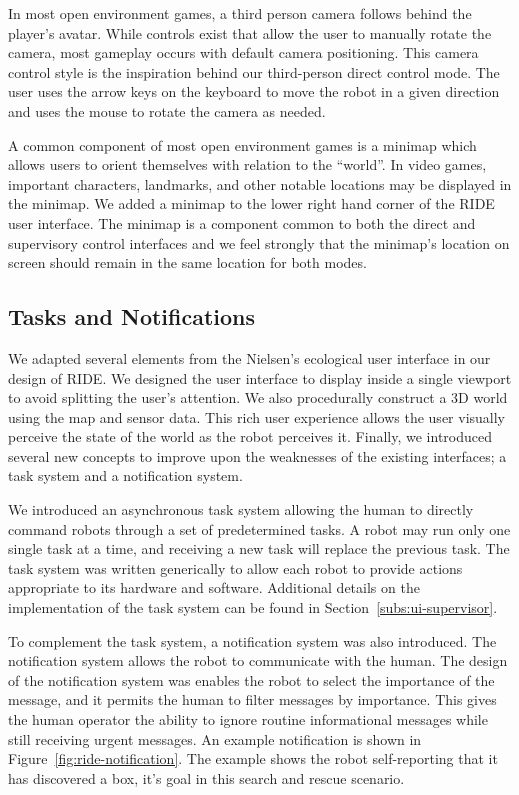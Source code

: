 In most open environment games, a third person camera follows behind the player's avatar. While controls exist that allow the user to manually rotate the camera, most gameplay occurs with default camera positioning. This camera control style is the inspiration behind our third-person direct control mode. The user uses the arrow keys on the keyboard to move the robot in a given direction and uses the mouse to rotate the camera as needed.

A common component of most open environment games is a minimap which allows users to orient themselves with relation to the ``world''. In video games, important characters, landmarks, and other notable locations may be displayed in the minimap. We added a minimap to the lower right hand corner of the RIDE user interface. The minimap is a component common to both the direct and supervisory control interfaces and we feel strongly that the minimap's location on screen should remain in the same location for both modes.

\subsection{Tasks and Notifications}
We adapted several elements from the Nielsen's ecological user interface in our design of RIDE. We designed the user interface to display inside a single viewport to avoid splitting the user's attention. We also procedurally construct a 3D world using the map and sensor data. This rich user experience allows the user visually perceive the state of the world as the robot perceives it. Finally, we introduced several new concepts to improve upon the weaknesses of the existing interfaces; a task system and a notification system.

We introduced an asynchronous task system allowing the human to directly command robots through a set of predetermined tasks. A robot may run only one single task at a time, and receiving a new task will replace the previous task. The task system was written generically to allow each robot to provide actions appropriate to its hardware and software. Additional details on the implementation of the task system can be found in Section~\ref{subs:ui-supervisor}.

To complement the task system, a notification system was also introduced. The notification system allows the robot to communicate with the human. The design of the notification system was enables the robot to select the importance of the message, and it permits the human to filter messages by importance. This gives the human operator the ability to ignore routine informational messages while still receiving urgent messages. An example notification is shown in Figure~\ref{fig:ride-notification}. The example shows the robot self-reporting that it has discovered a box, it's goal in this search and rescue scenario.

